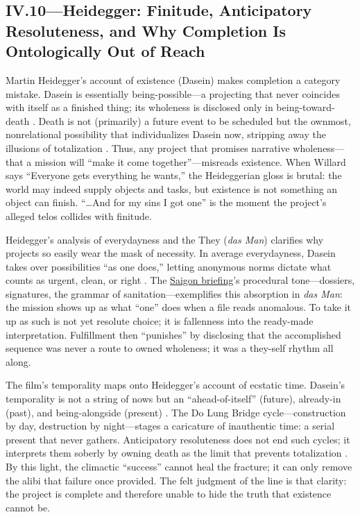 \subsection*{IV.10—Heidegger: Finitude, Anticipatory Resoluteness, and Why Completion Is
	Ontologically Out of Reach}
\label{ssec:iii-heidegger}
Martin Heidegger's account of existence (Dasein) makes completion a category mistake. Dasein is
essentially being-possible—a projecting that never coincides with itself as a finished thing;
its wholeness is disclosed only in being-toward-death \parencite[pp.~279--311]{HeideggerBT1962}.
Death is not (primarily) a future event to be scheduled but the ownmost, nonrelational
possibility that individualizes Dasein now, stripping away the illusions of totalization
\parencite[pp.~294--307]{HeideggerBT1962}. Thus, any project that promises narrative wholeness—that
a mission will ``make it come together''—misreads existence. When Willard says ``Everyone gets
everything he wants,'' the Heideggerian gloss is brutal: the world may indeed supply objects and
tasks, but existence is not something an object can finish. ``\ldots And for my sins I got one''
is the moment the project's alleged telos collides with finitude.

Heidegger's analysis of everydayness and the They (\emph{das Man}) clarifies why projects so
easily wear the mask of necessity. In average everydayness, Dasein takes over possibilities ``as
one does,'' letting anonymous norms dictate what counts as urgent, clean, or right
\parencite[pp.~149--168]{HeideggerBT1962}. The \hyperref[scene:briefing]{Saigon briefing}'s
procedural tone—dossiers, signatures, the grammar of sanitation—exemplifies this absorption in
\emph{das Man}: the mission
shows up as what ``one'' does when a file reads anomalous. To take it up as such is not yet
resolute choice; it is fallenness into the ready-made interpretation. Fulfillment then
``punishes'' by disclosing that the accomplished sequence was never a route to owned wholeness;
it was a they-self rhythm all along.

The film's temporality maps onto Heidegger's account of ecstatic time. Dasein's temporality is
not a string of nows but an ``ahead-of-itself'' (future), already-in (past), and being-alongside
(present) \parencite[pp.~373--383]{HeideggerBT1962}. The Do Lung Bridge cycle—construction by
day, destruction by night—stages a caricature of inauthentic time: a serial present that never
gathers. Anticipatory resoluteness does not end such cycles; it interprets them soberly by
owning death as the limit that prevents totalization \parencite[pp.~307--311]{HeideggerBT1962}.
By this light, the climactic ``success'' cannot heal the fracture; it can only remove the alibi
that failure once provided. The felt judgment of the line is that clarity: the project is
complete and therefore unable to hide the truth that existence cannot be.

